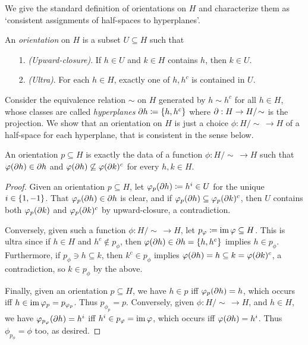 \documentclass{amsart}
\begin{document}
    We give the standard definition of orientations on $H$ and characterize them as `consistent assignments of half-spaces to hyperplanes'.

    \begin{definition}
        An \textit{orientation} on $H$ is a subset $U\subseteq H$ such that
        \begin{enumerate}
            \item[1.] \textit{(Upward-closure)}. If $h\in U$ and $k\in H$ contains $h$, then $k\in U$.
            \item[2.] \textit{(Ultra)}. For each $h\in H$, exactly one of $h,h^c$ is contained in $U$.
        \end{enumerate}
    \end{definition}

    Consider the equivalence relation $\sim$ on $H$ generated by $h\sim h^c$ for all $h\in H$, whose classes are called \textit{hyperplanes} $\partial h\coloneqq\left\{h,h^c\right\}$ where $\partial:H\to H/\!\sim$ is the projection. We show that an orientation on $H$ is just a choice $\phi:H/\!\sim\,\to H$ of a half-space for each hyperplane, that is consistent in the sense below.

    \begin{proposition}\label{correspondence}
        An orientation $p\subseteq H$ is exactly the data of a function $\phi:H/\!\sim\,\to H$ such that $\varphi(\partial h)\in\partial h$ and $\varphi(\partial h)\not\subseteq\varphi(\partial k)^c$ for every $h,k\in H$.
    \end{proposition}
    \begin{proof}
        Given an orientation $p\subseteq H$, let $\varphi_p(\partial h)\coloneqq h^i\in U$ for the unique $i\in\left\{1,-1\right\}$. That $\varphi_p(\partial h)\in\partial h$ is clear, and if $\varphi_p(\partial h)\subseteq\varphi_p(\partial k)^c$, then $U$ contains both $\varphi_p(\partial k)$ and $\varphi_p(\partial k)^c$ by upward-closure, a contradiction.

        Conversely, given such a function $\phi:H/\!\sim\,\to H$, let $p_\varphi\coloneqq\operatorname{im}\varphi\subseteq H$. This is ultra since if $h\in H$ and $h^c\not\in p_\phi$, then $\varphi(\partial h)\in\partial h=\left\{h,h^c\right\}$ implies $h\in p_\phi$. Furthermore, if $p_\phi\ni h\subseteq k$, then $k^c\in p_\phi$ implies $\varphi(\partial h)=h\subseteq k=\varphi(\partial k)^c$, a contradiction, so $k\in p_\phi$ by the above.

        Finally, given an orientation $p\subseteq H$, we have $h\in p$ iff $\varphi_p(\partial h)=h$, which occurs iff $h\in\operatorname{im}\varphi_p=p_{\varphi_p}$. Thus $p_{\phi_p}=p$. Conversely, given $\phi:H/\!\sim\,\to H$, and $h\in H$, we have $\varphi_{p_{\varphi}}(\partial h)=h^i$ iff $h^i\in p_\varphi=\operatorname{im}\varphi$, which occurs iff $\varphi(\partial h)=h^i$. Thus $\phi_{p_\phi}=\phi$ too, as desired.
    \end{proof}
\end{document}
